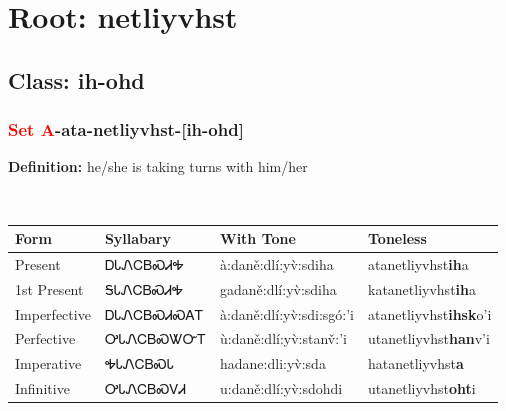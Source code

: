 \needspace{4in}
\section*{Root: netliyvhst}
\nopagebreak
{}
\needspace{3in}
\subsection*{Class: ih-ohd}
\nopagebreak
\needspace{2in}
\subsubsection*{\textcolor{Red}{Set A}{-}ata{-}\textbf{netliyvhst}{-}[ih-ohd]}
\nopagebreak
\textbf{Definition: } he/she is taking turns with him/her
\\[0.5em]
\begin{tabularx}{\textwidth}{l X X X}%
\toprule%
\textbf{Form}&\textbf{Syllabary}&\textbf{With Tone}&\textbf{Toneless}\\%
\midrule%
Present&ᎠᏓᏁᏟᏴᏍᏗᎭ&à:daně:dlí:yv̀:sdiha&atanetliyvhst\textbf{ih}a\\%
1st Present&ᎦᏓᏁᏟᏴᏍᏗᎭ&gadaně:dlí:yv̀:sdiha&katanetliyvhst\textbf{ih}a\\%
Imperfective&ᎠᏓᏁᏟᏴᏍᏗᏍᎪᎢ&à:daně:dlí:yv̀:sdi:sgó:’i&atanetliyvhst\textbf{ihsk}o'i\\%
Perfective&ᎤᏓᏁᏟᏴᏍᏔᏅᎢ&ù:daně:dlí:yv̀:stanv̌:’i&utanetliyvhst\textbf{han}v'i\\%
Imperative&ᎭᏓᏁᏟᏴᏍᏓ&hadane:dli:yv̀:sda&hatanetliyvhst\textbf{a}\\%
Infinitive&ᎤᏓᏁᏟᏴᏍᏙᏗ&u:daně:dlí:yv̀:sdohdi&utanetliyvhst\textbf{oht}i\\%
\bottomrule%
\end{tabularx}
\\[1em]